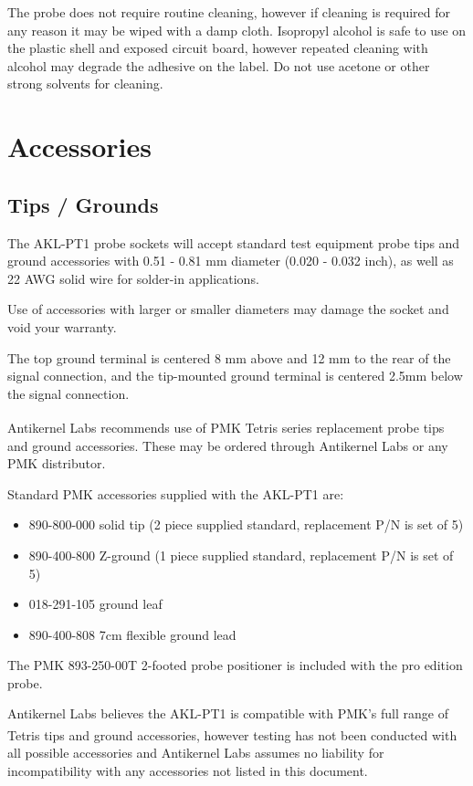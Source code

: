 \documentclass[11pt]{article}
\begin{document}
The probe does not require routine cleaning, however if cleaning is required for any reason it may be wiped with a damp
cloth. Isopropyl alcohol is safe to use on the plastic shell and exposed circuit board, however repeated cleaning with
alcohol may degrade the adhesive on the label. Do not use acetone or other strong solvents for cleaning.

\pagebreak
\section{Accessories}

\subsection{Tips / Grounds}

The AKL-PT1 probe sockets will accept standard test equipment probe tips and ground accessories with 0.51 - 0.81 mm
diameter (0.020 - 0.032 inch), as well as 22 AWG solid wire for solder-in applications.

Use of accessories with larger or smaller diameters may damage the socket and void your warranty.

The top ground terminal is centered 8 mm above and 12 mm to the rear of the signal connection, and the tip-mounted
ground terminal is centered 2.5mm below the signal connection.

Antikernel Labs recommends use of PMK Tetris\textsuperscript{\textregistered} series replacement probe tips and ground
accessories. These may be ordered through Antikernel Labs or any PMK distributor.

Standard PMK accessories supplied with the AKL-PT1 are:
\begin{itemize}
\item 890-800-000 solid tip (2 piece supplied standard, replacement P/N is set of 5)
\item 890-400-800 Z-ground (1 piece supplied standard, replacement P/N is set of 5)
\item 018-291-105 ground leaf
\item 890-400-808 7cm flexible ground lead
\end{itemize}

The PMK 893-250-00T 2-footed probe positioner is included with the pro edition probe.

Antikernel Labs believes the AKL-PT1 is compatible with PMK's full range of Tetris\textsuperscript{\textregistered}
tips and ground accessories, however testing has not been conducted with all possible accessories and Antikernel Labs
assumes no liability for incompatibility with any accessories not listed in this document.
\end{document}

